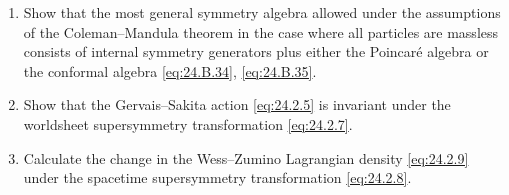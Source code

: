 

\begin{enumerate}
  \item Show that the most general symmetry algebra allowed under the
  assumptions of the Coleman--Mandula theorem in the case where all
  particles are massless consists of internal symmetry generators plus
  either the Poincar\'e algebra or the conformal algebra
  \eqref{eq:24.B.34}, \eqref{eq:24.B.35}.

  \item Show that the Gervais--Sakita action \eqref{eq:24.2.5} is invariant
  under the worldsheet supersymmetry transformation \eqref{eq:24.2.7}.

  \item Calculate the change in the Wess--Zumino Lagrangian density
  \eqref{eq:24.2.9} under the spacetime supersymmetry transformation
  \eqref{eq:24.2.8}.
\end{enumerate}



